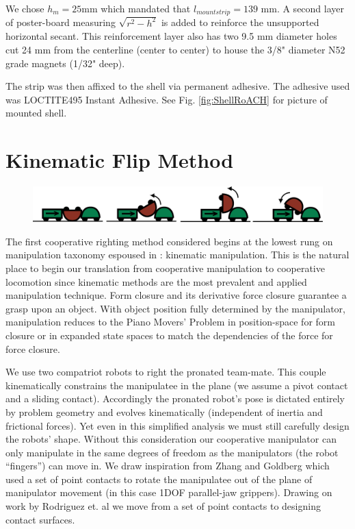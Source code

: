\documentclass[letterpaper]{report}
\begin{document}
We chose $h_m = 25$mm which mandated that $l_{mountstrip} = 139$ mm.
A second layer of poster-board measuring $\sqrt{r^2-h^2}$ is added to reinforce the unsupported horizontal secant.
This reinforcement layer also has two 9.5 mm diameter holes cut 24 mm from the centerline (center to center) to house the 3/8" diameter N52 grade magnets (1/32" deep).

The strip was then affixed to the shell via permanent adhesive. The adhesive used was LOCTITE495 Instant Adhesive.
See Fig. \ref{fig:ShellRoACH} for picture of mounted shell.





\chapter{Kinematic Flip Method}
\begin{figure}[ht]
\centering
\includegraphics[width=1.0\textwidth]{Kinematic_CoopCartoon.png}
\end{figure}

The first cooperative righting method considered begins at the lowest rung on manipulation taxonomy espoused in \cite{MasonMORMBook}: kinematic manipulation.
This is the natural place to begin our translation from cooperative manipulation to cooperative locomotion since kinematic methods are the most prevalent and applied manipulation technique.
Form closure and its derivative force closure guarantee a grasp upon an object.
With object position fully determined by the manipulator, manipulation reduces to the Piano Movers' Problem in position-space for form closure or in expanded state spaces to match the dependencies of the force for force closure.

We use two compatriot robots to right the pronated team-mate. This couple kinematically constrains the manipulatee in the plane (we assume a pivot contact and a sliding contact).
Accordingly the pronated robot's pose is dictated entirely by problem geometry and evolves kinematically (independent of inertia and frictional forces).
Yet even in this simplified analysis we must still carefully design the robots' shape. Without this consideration our cooperative manipulator can only manipulate in the same degrees of freedom as the manipulators (the robot ``fingers'') can move in.
We draw inspiration from Zhang and Goldberg \cite{zhang2002gripper} which used a set of point contacts to rotate the manipulatee out of the plane of manipulator movement (in this case 1DOF parallel-jaw grippers).
Drawing on work by Rodriguez et. al \cite{rodriguez2013effector} we move from a set of point contacts to designing contact surfaces.
\end{document}
